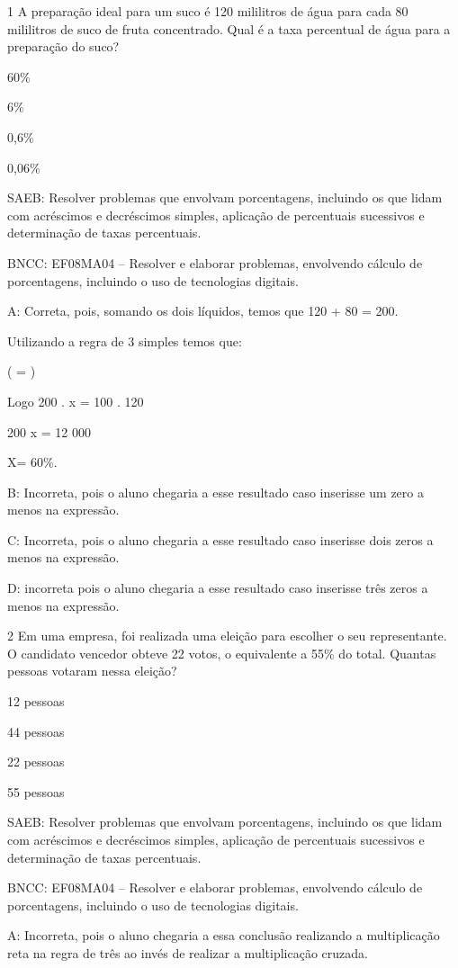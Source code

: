 {\num{1} A preparação ideal para um suco é 120 mililitros de água para cada 80
mililitros de suco de fruta concentrado. Qual é a taxa percentual de
água para a preparação do suco?
\item 60\%
\item 6\%
\item 0,6\%
\item 0,06\%

SAEB: Resolver problemas que envolvam porcentagens, incluindo os que
lidam com acréscimos e decréscimos simples, aplicação de percentuais
sucessivos e determinação de taxas percentuais.

BNCC: EF08MA04 -- Resolver e elaborar problemas, envolvendo cálculo de
porcentagens, incluindo o uso de tecnologias digitais.

A: Correta, pois, somando os dois líquidos, temos que 120 + 80 = 200.

Utilizando a regra de 3 simples temos que:

( = )

Logo 200 . x = 100 . 120

200 x = 12 000

X= 60\%.

B: Incorreta, pois o aluno chegaria a esse resultado caso inserisse um
zero a menos na expressão.

C: Incorreta, pois o aluno chegaria a esse resultado caso inserisse dois
zeros a menos na expressão.

D: incorreta pois o aluno chegaria a esse resultado caso inserisse três
zeros a menos na expressão.

\num{2} Em uma empresa, foi realizada uma eleição para escolher o seu
representante. O candidato vencedor obteve 22 votos, o equivalente a
55\% do total. Quantas pessoas votaram nessa eleição?
\item 12 pessoas
\item 44 pessoas
\item 22 pessoas
\item 55 pessoas

SAEB: Resolver problemas que envolvam porcentagens, incluindo os que
lidam com acréscimos e decréscimos simples, aplicação de percentuais
sucessivos e determinação de taxas percentuais.

BNCC: EF08MA04 -- Resolver e elaborar problemas, envolvendo cálculo de
porcentagens, incluindo o uso de tecnologias digitais.

A: Incorreta, pois o aluno chegaria a essa conclusão realizando a
multiplicação reta na regra de três ao invés de realizar a multiplicação
cruzada.

}
